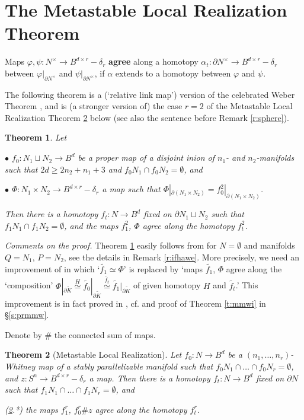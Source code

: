 \documentclass[12pt]{article}
\def\diag{\delta}
\renewcommand{\t}[1]{\ensuremath{\widetilde{#1}}}
\theoremstyle{plain}
\newtheorem{Theorem}{Theorem}[section]
\theoremstyle{definition}
\begin{document}
\section{The Metastable Local Realization Theorem}\label{s:metar}

Maps $\varphi,\psi:N^\times\to B^{d\times r}-\diag_r$ {\bf agree} along a homotopy
$\alpha_t:\partial N^\times\to B^{d\times r}-\diag_r$ between $\varphi|_{\partial N^\times}$ and
$\psi|_{\partial N^\times}$, if
$\alpha$ extends to a homotopy between $\varphi$ and $\psi$.

The following theorem is a (`relative link map') version of the celebrated Weber Theorem 
\cite[the Weber Theorem 8.1]{Sk06}, and is (a stronger version of) the case $r=2$ of the Metastable 
Local Realization Theorem \ref{l:ldmr} below (see also the sentence before Remark \ref{r:sphere}).

\begin{Theorem}\label{l:ldmr2} Let

$\bullet$ $f_0:N_1\sqcup N_2\to B^d$ be a proper map of a disjoint inion of $n_1$- and $n_2$-manifolds such that
$2d\ge2n_2+n_1+3$ and $f_0N_1\cap f_0N_2=\emptyset$, and

$\bullet$ $\Phi:N_1\times N_2\to B^{d\times r}-\diag_r$ a map such that
$\Phi|_{\partial(N_1\times N_2)}=f_0^2|_{\partial(N_1\times N_2)}$.

Then there is a homotopy $f_t:N\to B^d$ fixed on $\partial N_1\sqcup N_2$ such that $f_1N_1\cap f_1N_2=\emptyset$,
and the maps $f_1^2$, $\Phi$ agree along the homotopy $f_t^2$.
\end{Theorem}

{\it Comments on the proof.}
Theorem \ref{l:ldmr2} easily follows from \cite[Theorem 1.3]{Sk00} for $N=\emptyset$ and manifolds $Q=N_1$, $P=N_2$, see the details in Remark \ref{r:ifhawe}.
More precisely, we need an improvement of \cite[Theorem 1.3]{Sk00} in which `$\t{f_1}\simeq\Phi$' is replaced by
`maps $\t{f_1}$, $\Phi$ agree along the `composition'
$\Phi|_{\partial\t K}\overset{H}\simeq \t{f_0}|_{\partial\t K}\overset{\t{f_t}}\simeq \t{f_1}|_{\partial\t K}$ of given homotopy $H$ and $\t{f_t}$.'
This improvement is in fact proved in \cite[\S2]{Sk00},
cf. \cite[Realization Lemma 2.2]{Sk00} and proof of Theorem \ref{t:mmwi} in \S\ref{s:prmmw}.

\medskip
Denote by $\#$ the connected sum of maps.

\begin{Theorem}[Metastable Local Realization]\label{l:ldmr}
Let $f_0:N\to B^d$ be a $(n_1,\ldots,n_r)$-Whitney map of a stably parallelizable manifold such that $f_0N_1\cap\ldots\cap f_0N_r=\emptyset$, and $z:S^n\to B^{d\times r}-\diag_r$ a map.
Then there is a homotopy $f_t:N\to B^d$ fixed on $\partial N$ such that $f_1N_1\cap\ldots\cap f_1N_r=\emptyset$, and

(\ref{l:ldmr}.*) the maps $f_1^r$, $f_0^r\#z$ agree along the homotopy $f_t^r$.
\end{Theorem}
\end{document}
